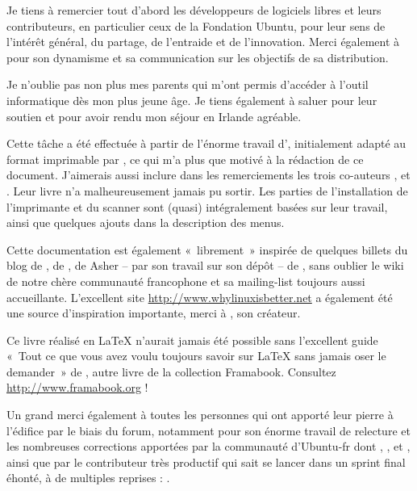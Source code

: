 \begin{Remerciements}
Je tiens à remercier tout d'abord les développeurs de logiciels libres et leurs contributeurs, en particulier ceux de la Fondation Ubuntu, pour leur sens de l'intérêt général, du partage, de l'entraide et de l'innovation. Merci également à  pour son dynamisme et sa communication sur les objectifs de sa distribution.\par
Je n'oublie pas non plus mes parents qui m'ont permis d'accéder à l'outil informatique dès mon plus jeune âge. Je tiens également à saluer  pour leur soutien et pour avoir rendu mon séjour en Irlande agréable.\par
Cette tâche a été effectuée à partir de l'énorme travail d', initialement adapté au format imprimable par , ce qui m'a plus que motivé à la rédaction de ce document. J'aimerais aussi inclure dans les remerciements les trois co-auteurs ,  et . Leur livre n'a malheureusement jamais pu sortir. Les parties de l'installation de l'imprimante et du scanner sont (quasi) intégralement basées sur leur travail, ainsi que quelques ajouts dans la description des menus.\par
Cette documentation est également «~librement~» inspirée de quelques billets du blog de , de , de Asher -- par son travail sur son dépôt -- de  , sans oublier le wiki de notre chère communauté francophone et sa mailing-list toujours aussi accueillante. L'excellent site \url{http://www.whylinuxisbetter.net} a également été une source d'inspiration importante, merci à  , son créateur.\par
Ce livre réalisé en \LaTeX{} n'aurait jamais été possible sans l'excellent guide «~Tout ce que vous avez voulu toujours savoir sur \LaTeX{} sans jamais oser le demander~» de , autre livre de la collection Framabook. Consultez \url{http://www.framabook.org} !\par
Un grand merci également à toutes les personnes qui ont apporté leur pierre à l'édifice par le biais du forum, notamment  pour son énorme travail de relecture et les nombreuses corrections apportées par la communauté d'Ubuntu-fr dont , ,  et , ainsi que par le contributeur très productif qui sait se lancer dans un sprint final éhonté, à de multiples reprises : .\par

\end{Remerciements}
